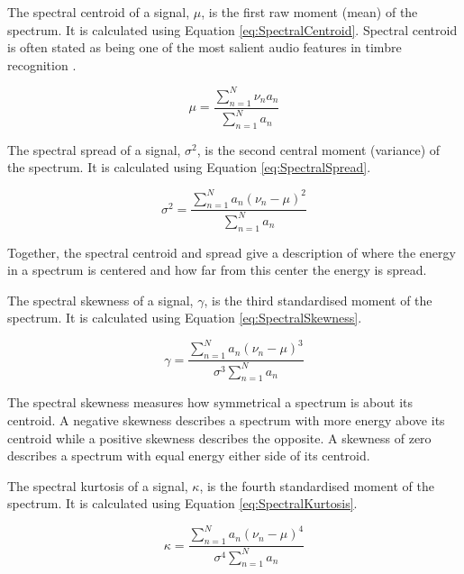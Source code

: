 			The spectral centroid of a signal, $\mu$, is the first raw moment (mean) of the spectrum. It is
			calculated using Equation \ref{eq:SpectralCentroid}. Spectral centroid is often stated as being one
			of the most salient audio features in timbre recognition \citep{freed1990auditory, lakatos2000a}. 

			\begin{equation}
				\mu = \frac{\sum_{n = 1}^{N} \nu_{n}a_{n}}
					   {\sum_{n = 1}^{N} a_{n}}
				\label{eq:SpectralCentroid}
			\end{equation}

			The spectral spread of a signal, $\sigma^{2}$, is the second central moment (variance) of the
			spectrum. It is calculated using Equation \ref{eq:SpectralSpread}.

			\begin{equation}
				\sigma^{2} = \frac{\sum_{n = 1}^{N} a_{n}(\nu_{n} - \mu)^{2}}
						  {\sum_{n = 1}^{N} a_{n}}
				\label{eq:SpectralSpread}
			\end{equation}

			Together, the spectral centroid and spread give a description of where the energy in a spectrum is
			centered and how far from this center the energy is spread.

			The spectral skewness of a signal, $\gamma$, is the third standardised moment of the spectrum. It is
			calculated using Equation \ref{eq:SpectralSkewness}.

			\begin{equation}
				\gamma = \frac{\sum_{n = 1}^{N} a_{n}(\nu_{n} - \mu)^{3}}
					      {\sigma^{3}\sum_{n = 1}^{N} a_{n}}
				\label{eq:SpectralSkewness}
			\end{equation}

			The spectral skewness measures how symmetrical a spectrum is about its centroid. A negative skewness
			describes a spectrum with more energy above its centroid while a positive skewness describes the
			opposite. A skewness of zero describes a spectrum with equal energy either side of its centroid.

			The spectral kurtosis of a signal, $\kappa$, is the fourth standardised moment of the spectrum. It
			is calculated using Equation \ref{eq:SpectralKurtosis}.

			\begin{equation}
				\kappa = \frac{\sum_{n = 1}^{N} a_{n}(\nu_{n} - \mu)^{4}}
					      {\sigma^{4}\sum_{n = 1}^{N} a_{n}}
				\label{eq:SpectralKurtosis}
			\end{equation}

